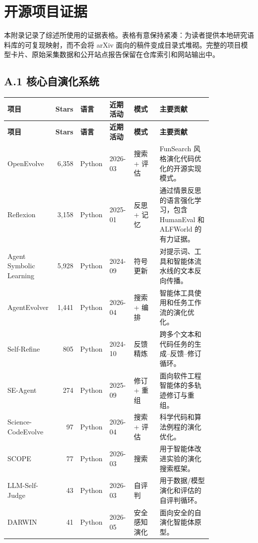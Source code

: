 
\section{开源项目证据}
\label{app:projects}

本附录记录了综述所使用的证据表格。表格有意保持紧凑：为读者提供本地研究语料库的可复现映射，而不会将 arXiv 面向的稿件变成目录式堆砌。完整的项目模型卡片、原始采集数据和公开站点报告保留在仓库索引和网站输出中。

\subsection*{A.1 核心自演化系统}

{\TableTight
\begin{longtable}{@{}L{0.17\linewidth}r L{0.12\linewidth}L{0.12\linewidth}L{0.14\linewidth}L{0.27\linewidth}@{}}
\toprule
\textbf{项目} & \textbf{Stars} & \textbf{语言} & \textbf{近期活动} & \textbf{模式} & \textbf{主要贡献} \\
\midrule
\endfirsthead
\toprule
\textbf{项目} & \textbf{Stars} & \textbf{语言} & \textbf{近期活动} & \textbf{模式} & \textbf{主要贡献} \\
\midrule
\endhead
\bottomrule
\endlastfoot
OpenEvolve & 6,358 & Python & 2026-03 & 搜索 + 评估 & FunSearch 风格演化代码优化的开源实现模式。 \\
Reflexion & 3,158 & Python & 2025-01 & 反思 + 记忆 & 通过情景反思的语言强化学习，包含 HumanEval 和 ALFWorld 的有力证据。 \\
Agent Symbolic Learning & 5,928 & Python & 2024-09 & 符号更新 & 对提示词、工具和智能体流水线的文本反向传播。 \\
AgentEvolver & 1,441 & Python & 2026-04 & 搜索 + 编排 & 智能体工具使用和任务工作流的演化优化。 \\
Self-Refine & 805 & Python & 2024-10 & 反馈精炼 & 跨多个文本和代码任务的生成--反馈--修订循环。 \\
SE-Agent & 274 & Python & 2025-09 & 修订 + 重组 & 面向软件工程智能体的多轨迹修订与重组。 \\
Science-CodeEvolve & 97 & Python & 2026-04 & 搜索 + 评估 & 科学代码和算法例程的演化优化。 \\
SCOPE & 77 & Python & 2026-03 & 搜索 & 用于智能体改进实验的演化搜索框架。 \\
LLM-Self-Judge & 43 & Python & 2026-03 & 自评判 & 用于数据/模型演化和评估的自评判循环。 \\
DARWIN & 41 & Python & 2026-05 & 安全感知演化 & 面向安全的自演化智能体原型。 \\
\end{longtable}}

